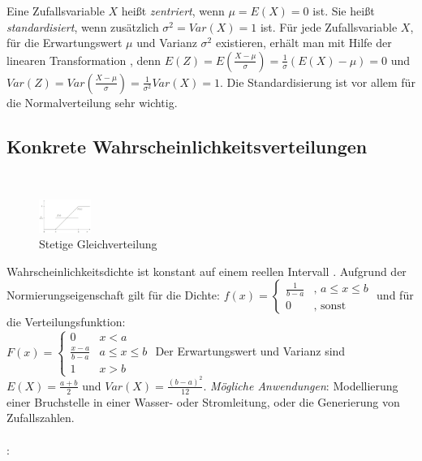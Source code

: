 Eine Zufallsvariable $X$ heißt \emph{zentriert}, wenn $\mu = E(X) = 0$ ist. Sie heißt \emph{standardisiert}, wenn zusätzlich $\sigma^2 = Var(X) = 1$ ist. Für jede Zufallsvariable $X$, für die Erwartungswert $\mu$ und Varianz $\sigma^2$ existieren, erhält man mit Hilfe der linearen Transformation , denn $E(Z) = E(\frac{X - \mu}{\sigma}) = \frac{1}{\sigma}(E(X) - \mu) = 0$ und $Var(Z) = Var(\frac{X - \mu}{\sigma}) = \frac{1}{\sigma^2} Var(X) = 1$. Die Standardisierung ist vor allem für die Normalverteilung sehr wichtig.
\subsection{Konkrete Wahrscheinlichkeitsverteilungen}
\,
\begin{figure}
    \vspace{-7mm}
    \centering
    \includegraphics[width=0.15\textwidth]{images/6.5_f_F_stetige_gleichverteilung.png}
    \caption{Stetige Gleichverteilung}
    \vspace{-14mm}
    \label{fig:stetige_gleichverteilung_f_F}
\end{figure}
 Wahrscheinlichkeitsdichte ist konstant auf einem reellen Intervall \hlc{$[a, b]$}. Aufgrund der Normierungseigenschaft gilt für die Dichte: $f(x) = \begin{cases}
    \frac{1}{b-a} & \text{, }a \le x \le b\\
    0 & \text{, sonst}
\end{cases}$ und für die Verteilungsfunktion: \\$F(x) = \begin{cases}
    0 & x < a\\
    \frac{x-a}{b-a} & a\le x \le b\\
    1 & x > b
\end{cases}$ Der Erwartungswert und Varianz sind $E(X) = \frac{a + b}{2}$ und $Var(X) = \frac{(b - a)^2}{12}$. \emph{Mögliche Anwendungen}: Modellierung einer Bruchstelle in einer Wasser- oder Stromleitung, oder die Generierung von Zufallszahlen.\\\\
:
